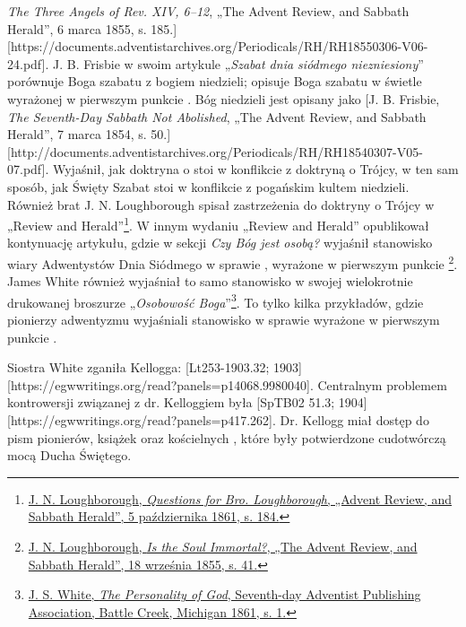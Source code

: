 \textit{The Three Angels of Rev. XIV, 6--12}, „The Advent Review, and Sabbath Herald”, 6 marca 1855, s. 185.][https://documents.adventistarchives.org/Periodicals/RH/RH18550306-V06-24.pdf]. J. B. Frisbie w swoim artykule „\textit{Szabat dnia siódmego niezniesiony}” porównuje Boga szabatu z bogiem niedzieli; opisuje Boga szabatu w świetle  wyrażonej w pierwszym punkcie . Bóg niedzieli jest opisany jako [J. B. Frisbie, \textit{The Seventh-Day Sabbath Not Abolished}, „The Advent Review, and Sabbath Herald”, 7 marca 1854, s. 50.][http://documents.adventistarchives.org/Periodicals/RH/RH18540307-V05-07.pdf]. Wyjaśnił, jak doktryna o  stoi w konflikcie z doktryną o Trójcy, w ten sam sposób, jak Święty Szabat stoi w konflikcie z pogańskim kultem niedzieli. Również brat J. N. Loughborough spisał zastrzeżenia do doktryny o Trójcy w „Review and Herald”\footnote{\href{https://adventistdigitallibrary.org/adl-349160/advent-review-and-sabbath-herald-november-5-1861}{J. N. Loughborough, \textit{Questions for Bro. Loughborough}, „Advent Review, and Sabbath Herald”, 5 października 1861, s. 184.}}. W innym wydaniu „Review and Herald” opublikował kontynuację artykułu, gdzie w sekcji \textit{Czy Bóg jest osobą?} wyjaśnił stanowisko wiary Adwentystów Dnia Siódmego w sprawie , wyrażone w pierwszym punkcie \footnote{\href{http://documents.adventistarchives.org/Periodicals/RH/RH18550918-V07-06.pdf}{J. N. Loughborough, \textit{Is the Soul Immortal?}, „The Advent Review, and Sabbath Herald”, 18 września 1855, s. 41.}}. James White również wyjaśniał to samo stanowisko w swojej wielokrotnie drukowanej broszurze „\textit{Osobowość Boga}”\footnote{\href{https://egwwritings.org/?ref=en_PERGO.1.1&para=1471.3}{J. S. White, \textit{The Personality of God}, Seventh-day Adventist Publishing Association, Battle Creek, Michigan 1861, s. 1.}}. To tylko kilka przykładów, gdzie pionierzy adwentyzmu wyjaśniali stanowisko w sprawie  wyrażone w pierwszym punkcie .

Siostra White zganiła Kellogga: [Lt253-1903.32; 1903][https://egwwritings.org/read?panels=p14068.9980040]. Centralnym problemem kontrowersji związanej z dr. Kelloggiem była [SpTB02 51.3; 1904][https://egwwritings.org/read?panels=p417.262]. Dr. Kellogg miał dostęp do pism pionierów, książek oraz kościelnych , które były potwierdzone cudotwórczą mocą Ducha Świętego.

